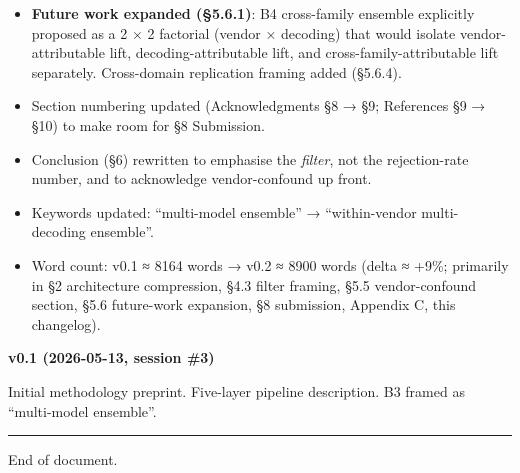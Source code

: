 \documentclass[
  letterpaper,
  11pt]{article}
\begin{document}
\begin{itemize}
{  Benchmarks} fallback, \emph{Journal of Statistical Software} secondary
  fallback.
\item
  \textbf{Future work expanded (§5.6.1)}: B4 cross-family ensemble
  explicitly proposed as a 2 × 2 factorial (vendor × decoding) that
  would isolate vendor-attributable lift, decoding-attributable lift,
  and cross-family-attributable lift separately. Cross-domain
  replication framing added (§5.6.4).
\item
  Section numbering updated (Acknowledgments §8 → §9; References §9 →
  §10) to make room for §8 Submission.
\item
  Conclusion (§6) rewritten to emphasise the \emph{filter}, not the
  rejection-rate number, and to acknowledge vendor-confound up front.
\item
  Keywords updated: ``multi-model ensemble'' → ``within-vendor
  multi-decoding ensemble''.
\item
  Word count: v0.1 ≈ 8164 words → v0.2 ≈ 8900 words (delta ≈ +9\%;
  primarily in §2 architecture compression, §4.3 filter framing, §5.5
  vendor-confound section, §5.6 future-work expansion, §8 submission,
  Appendix C, this changelog).
\end{itemize}

\textbf{v0.1 (2026-05-13, session \#3)}

Initial methodology preprint. Five-layer pipeline description. B3 framed
as ``multi-model ensemble''.

\begin{center}\rule{0.5\linewidth}{0.5pt}\end{center}

End of document.
\end{document}
